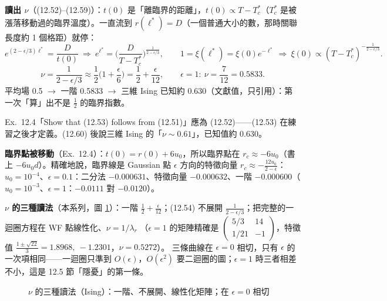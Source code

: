 \textbf{讀出 $\nu$}（(12.52)--(12.59)）：$t(0)$ 是「離臨界的距離」，$t(0)\propto T-T_c^*$（$T_c^*$ 是被漲落移動過的臨界溫度）。一直流到 $r(\ell^*)=D$（一個普通大小的數，那時關聯長度約 1 個格距）就停：
\[e^{(2-\epsilon/3)\ell^*}=\frac D{t(0)}\ \Rightarrow\ e^{\ell^*}=\Big(\frac D{T-T_c^*}\Big)^{\frac1{2-\epsilon/3}},\qquad 1=\xi(\ell^*)=\xi(0)e^{-\ell^*}\ \Rightarrow\ \xi(0)\propto(T-T_c^*)^{-\frac1{2-\epsilon/3}}.\tag{12.52--12.58}\]
\[\nu=\frac1{2-\epsilon/3}\approx\frac12\Big(1+\frac\epsilon6\Big)=\frac12+\frac\epsilon{12},\qquad\epsilon=1:\ \nu=\frac7{12}=0.5833 .\tag{12.59--12.60}\]
平均場 0.5 $\to$ 一階 0.5833 $\to$ 三維 Ising 已知約 0.630（文獻值，只引用）：第一次「算」出不是 $\frac12$ 的臨界指數。
\begin{errbox}[p.~299，Ex.~12.4；(12.60) 後]
Ex.~12.4「Show that (12.53) follows from (12.51)」應為 (12.52)——(12.53) 在練習之後才定義。(12.60) 後說三維 Ising 的「$\nu\sim0.61$」，已知值約 0.630。
\end{errbox}
\textbf{臨界點被移動}（Ex.~12.4）：$t(0)=r(0)+6u_0$，所以臨界點在 $r_c\approx-6u_0$（書上 $-6u_0d$）。精確地說，臨界線是 Gaussian 點 $\epsilon$ 方向的特徵向量 $r_c\approx-\frac{12u_0}{2-\epsilon}$：
$u_0=10^{-4}$、$\epsilon=0.1$：二分法 $-0.000631$、特徵向量 $-0.000632$、一階 $-0.000600$（$u_0=10^{-3}$、$\epsilon=1$：$-0.0111$ 對 $-0.0120$）。

\textbf{$\nu$ 的三種讀法}（本系列，圖 \ref{twelve-fig-nu}）：一階 $\frac12+\frac\epsilon{12}$；(12.54) 不展開 $\frac1{2-\epsilon/3}$；把完整的一迴圈方程在 WF 點線性化、$\nu=1/\lambda_r$
（$\epsilon=1$ 的矩陣精確是 $\begin{pmatrix}5/3&14\\1/21&-1\end{pmatrix}$，特徵值 $\frac{1\pm\sqrt{22}}3=1.8968,\ -1.2301$，$\nu=0.5272$）。
三條曲線在 $\epsilon=0$ 相切，只有 $\epsilon$ 的一次項相同——一迴圈只準到 $O(\epsilon)$，$O(\epsilon^2)$ 要二迴圈的圖；$\epsilon=1$ 時三者相差不小，這是 12.5 節「隱憂」的第一條。

\begin{figure}[htbp]
\centering
\begin{minipage}[c]{0.62\linewidth}\centering\TwelveFigNu\end{minipage}\hfill
\begin{minipage}[c]{0.36\linewidth}\centering\footnotesize\setlength{\tabcolsep}{4pt}\TwelveTabNu\end{minipage}
\caption{$\nu$ 的三種讀法（Ising）：一階、不展開、線性化矩陣；在 $\epsilon=0$ 相切}\label{twelve-fig-nu}
\end{figure}

